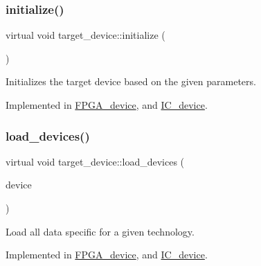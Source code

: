 \subsubsection{\texorpdfstring{initialize()}{initialize()}}
{\footnotesize\ttfamily virtual void target\+\_\+device\+::initialize (\begin{DoxyParamCaption}{ }\end{DoxyParamCaption})\hspace{0.3cm}{\ttfamily [pure virtual]}}



Initializes the target device based on the given parameters. 



Implemented in \hyperlink{classFPGA__device_a67c74984f6a780600c6e4858687c7298}{F\+P\+G\+A\+\_\+device}, and \hyperlink{classIC__device_a7f816b4ac2c63f1384bbbcea096505a8}{I\+C\+\_\+device}.

\mbox{\label{classtarget__device_a1823ff5860c8045600b512588415ac6e}} 
\subsubsection{\texorpdfstring{load\+\_\+devices()}{load\_devices()}}
{\footnotesize\ttfamily virtual void target\+\_\+device\+::load\+\_\+devices (\begin{DoxyParamCaption}\item[{const \hyperlink{target__device_8hpp_acedb2b7a617e27e6354a8049fee44eda}{target\+\_\+device\+Ref}}]{device }\end{DoxyParamCaption})\hspace{0.3cm}{\ttfamily [pure virtual]}}



Load all data specific for a given technology. 



Implemented in \hyperlink{classFPGA__device_aabe12325194fdd8b0f03ed674f64419b}{F\+P\+G\+A\+\_\+device}, and \hyperlink{classIC__device_af925283eae225d0c6deaec8a03a8ce41}{I\+C\+\_\+device}.

\mbox{\label{classtarget__device_a4112dad098867bd963a236a7374d4ba8}} 
